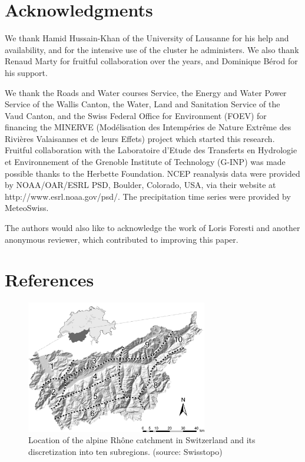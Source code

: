 \documentclass[review]{elsarticle}
\begin{document}
\section*{Acknowledgments}
We thank Hamid Hussain-Khan of the University of Lausanne for his help and availability, and for the intensive use of the cluster he administers. We also thank Renaud Marty for fruitful collaboration over the years, and Dominique B\'{e}rod for his support.

We thank the Roads and Water courses Service, the Energy and Water Power Service of the Wallis Canton, the Water, Land and Sanitation Service of the Vaud Canton, and the Swiss Federal Office for Environment (FOEV) for financing the MINERVE (Mod\'{e}lisation des Intemp\'{e}ries de Nature Extr\^{e}me des Rivi\`{e}res Valaisannes et de leurs Effets) project which started this research. Fruitful collaboration with the Laboratoire d'Etude des Transferts en Hydrologie et Environnement of the Grenoble Institute of Technology (G-INP) was made possible thanks to the Herbette Foundation. NCEP reanalysis data were provided by NOAA/OAR/ESRL PSD, Boulder, Colorado, USA, via their website at http://www.esrl.noaa.gov/psd/. The precipitation time series were provided by MeteoSwiss. 

The authors would also like to acknowledge the work of Loris Foresti and another anonymous reviewer, which contributed to improving this paper. 

\section*{References}



\clearpage


\begin{figure}[t]
	\centerline{\includegraphics[width=7.9cm]{fig01.pdf}}
	\caption{Location of the alpine Rh\^{o}ne catchment in Switzerland and its discretization into ten subregions. (source: Swisstopo)}
	\label{fig:map}
\end{figure}
\end{document}
